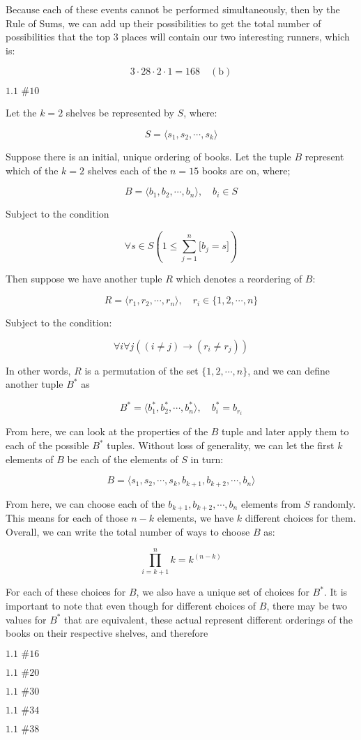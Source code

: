 \documentclass{article}
\newcommand{\problem}[2]{$\boxed{\text{#1 \##2}}$}
\newcommand{\subsolution}[2]{\boxed{#2\quad(\text{#1})}}
\newcommand{\ROS}{Rule of Sums}
\begin{document}
\begin{multicols*}{2}
\hspace{2em} Because each of these events cannot be performed
simultaneously, then by the \ROS, we can add up their possibilities to
get the total number of possibilities that the top 3 places will
contain our two interesting runners, which is:

\[
\subsolution{b}{3\cdot28\cdot2\cdot1=168}
\]

%
\problem{1.1}{10}

Let the $k=2$ shelves be represented by $S$, where:

\[
S=\langle s_1,s_2,\cdots,s_k\rangle
\]

Suppose there is an initial, unique ordering of books. Let the tuple
$B$ represent which of the $k=2$ shelves each of the $n=15$ books are
on, where;

\[
B=\langle b_1,b_2,\cdots,b_n\rangle,\quad b_i\in S
\]

Subject to the condition

\[
\forall s\in S\left(1\le\sum\limits_{j=1}^n\lbrack b_j=s\rbrack\right)
\]

Then suppose we have another tuple $R$ which denotes a reordering of
$B$:

\[
R=\langle r_1,r_2,\cdots,r_n\rangle,\quad r_i\in\{1,2,\cdots,n\}
\]

Subject to the condition:

\[
\forall i\forall j((i\ne j)\rightarrow(r_i\ne r_j))
\]

In other words, $R$ is a permutation of the set $\{1,2,\cdots,n\}$,
and we can define another tuple $B^*$ as

\[
B^*=\langle b^*_1,b^*_2,\cdots,b^*_n\rangle,\quad b^*_i=b_{r_i}
\]

From here, we can look at the properties of the $B$ tuple and later
apply them to each of the possible $B^*$ tuples. Without loss of
generality, we can let the first $k$ elements of $B$ be each of the
elements of $S$ in turn:

\[
B=\langle s_1, s_2,\cdots,s_k,b_{k+1},b_{k+2},\cdots,b_n\rangle
\]

From here, we can choose each of the $b_{k+1},b_{k+2},\cdots,b_n$
elements from $S$ randomly. This means for each of those $n-k$
elements, we have $k$ different choices for them. Overall, we can
write the total number of ways to choose $B$ as:

\[
\prod\limits_{i=k+1}^n k=k^(n-k)
\]

For each of these choices for $B$, we also have a unique set of
choices for $B^*$. It is important to note that even though for
different choices of $B$, there may be two values for $B^*$ that are
equivalent, these actual represent different orderings of the books on
their respective shelves, and therefore

%
\problem{1.1}{16}



%
\problem{1.1}{20}



%
\problem{1.1}{30}



%
\problem{1.1}{34}



%
\problem{1.1}{38}




\end{multicols*}
\end{document}
